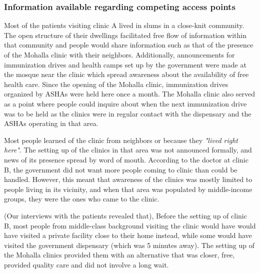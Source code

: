 
\subsubsection{Information available regarding competing access points}

Most of the patients visiting clinic A lived in slums in a close-knit community. The open structure of their dwellings facilitated free flow of information within that community and people would share information such as that of the presence of the Mohalla clinic with their neighbors. Additionally, announcements for immunization drives and health camps set up by the government were made at the mosque near the clinic which spread awareness about the availability of free health care. Since the opening of the Mohalla clinic, immunization drives organized by ASHAs were held here once a month. The Mohalla clinic also served as a point where people could inquire about when the next immunization drive was to be held as the clinics were in regular contact with the dispensary and the ASHAs operating in that area.

Most people learned of the clinic from neighbors or because they  \textit{"lived right here"}. The setting up of the clinics in that area was not announced formally, and news of its presence spread by word of mouth. According to the doctor at clinic B, the government did not want more people coming to clinic than could be handled. However, this meant that awareness of the clinics was mostly limited to people living in its vicinity, and when that area was populated by middle-income groups, they were the ones who came to the clinic.

(Our interviews with the patients revealed that), Before the setting up of clinic B, most people from middle-class background visiting the clinic would have would have visited a private facility close to their home instead, while some would have visited the government dispensary (which was 5 minutes away). The setting up of the Mohalla clinics provided them with an alternative that was closer, free, provided quality care and did not involve a long wait. 

